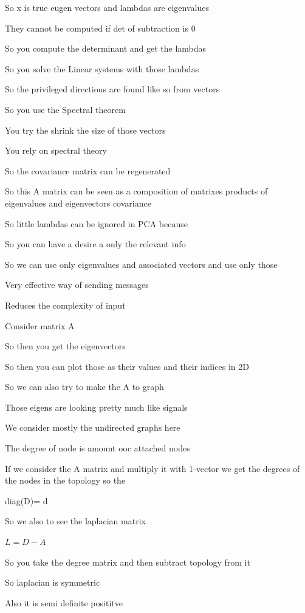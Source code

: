\documentclass{article}
\begin{document}
So x is true eugen vectors and lambdas are eigenvalues

They cannot be computed if det  of subtraction is 0

So you compute the determinant and get the lambdas

So you solve the Linear systems with those lambdas



So the privileged directions are found like so from vectors


So you use the Spectral theorem

You try the shrink the size of those vectors

You rely on spectral theory

So the covariance matrix can be regenerated 

So this A matrix can be seen as a composition of matrixes products of eigenvalues and eigenvectors covariance

So little lambdas can be ignored in PCA because

So you can have a desire a only the relevant info

So we can use only eigenvalues and associated vectors and use only those 

Very effective way of sending messages 

Reduces the complexity of input 

Consider matrix A

So then you get the eigenvectors

So then you can plot those as  their values and their indices in 2D

So we can also try to make the A to graph

Those eigens are looking pretty much like signals


We consider mostly the undirected graphs here

The degree of node is amount ooc attached nodes

If we consider the A matrix  and multiply it with 1-vector we get the degrees of the nodes in the topology so the 

diag(D)= d

So we also to see the laplacian matrix 

$L=D-A$

So you take the degree matrix and then subtract topology from it

So laplacian is symmetric 

Also it is semi definite posititve 
\end{document}
